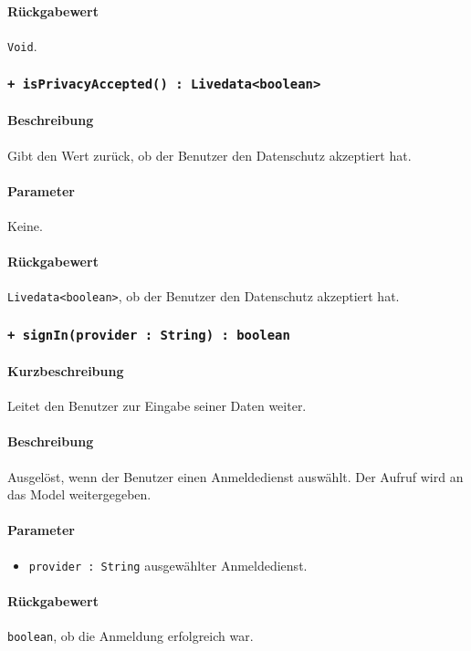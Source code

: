 \paragraph*{Rückgabewert}
\texttt{Void}.

\subsubsection{\texttt{+ isPrivacyAccepted() : Livedata<boolean>}}\label{App_Signup_ISignInController_isPrivacyAccepted}%
\paragraph*{Beschreibung}
Gibt den Wert zurück, ob der Benutzer den Datenschutz akzeptiert hat.
\paragraph*{Parameter}
Keine.
\paragraph*{Rückgabewert}
\texttt{Livedata<boolean>}, ob der Benutzer den Datenschutz akzeptiert hat.

\subsubsection{\texttt{+ signIn(provider : String) : boolean}}\label{App_Signup_ISignInController_signIn}%
\paragraph*{Kurzbeschreibung}
Leitet den Benutzer zur Eingabe seiner Daten weiter.
\paragraph*{Beschreibung}
Ausgelöst, wenn der Benutzer einen Anmeldedienst auswählt. 
Der Aufruf wird an das Model weitergegeben.
\paragraph*{Parameter}
\begin{itemize}
    \item \texttt{provider : String} ausgewählter Anmeldedienst.
\end{itemize}
\paragraph*{Rückgabewert}
\texttt{boolean}, ob die Anmeldung erfolgreich war.

